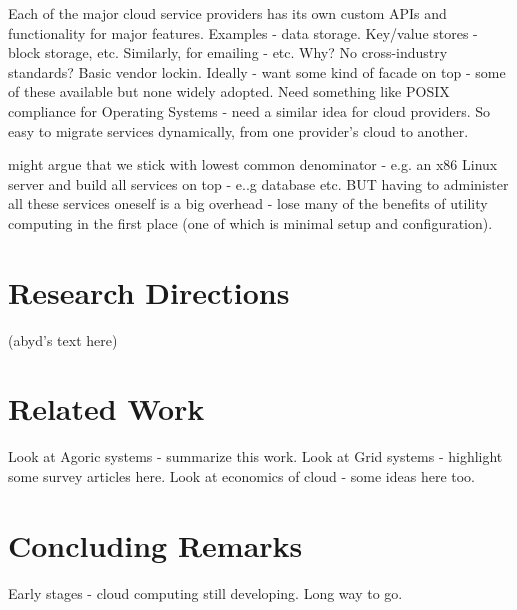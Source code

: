 \documentclass[conference,10pt]{IEEEtran}
\begin{document}
Each of the major cloud service providers has its own custom APIs and functionality for major features. Examples - data storage. Key/value stores - block storage, etc. Similarly, for emailing - etc. 
Why? No cross-industry standards? 
Basic vendor lockin. Ideally - want some kind of facade on top - some of these available but none widely adopted. Need something like POSIX compliance for Operating Systems - need a similar idea for cloud providers.
So easy to migrate services dynamically, from one provider's cloud to another.

might argue that we stick with lowest common denominator - e.g. an x86 Linux server and build all services on top - e..g database etc. BUT having to administer all these services oneself is a big overhead - lose many of the benefits of utility computing in the first place (one of which is minimal setup and configuration).


\section{Research Directions}

(abyd's text here)

\section{Related Work}

Look at Agoric systems - summarize this work.
Look at Grid systems - highlight some survey articles here.
Look at economics of cloud - some ideas here too.

\section{Concluding Remarks}

Early stages - cloud computing still developing. Long way to go.
\end{document}
